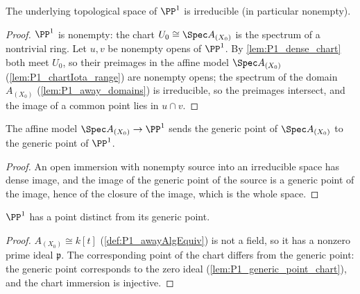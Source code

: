 \begin{theorem}
  \label{thm:P1_irreducible}
  \leanok
  The underlying topological space of \(\PP^1\) is irreducible (in particular nonempty).
\end{theorem}
\begin{proof}
  \leanok
  \(\PP^1\) is nonempty: the chart \(U_0 \cong \Spec A_{(X_0)}\) is the spectrum of a
  nontrivial ring. Let \(u, v\) be nonempty opens of \(\PP^1\). By
  \ref{lem:P1_dense_chart} both meet \(U_0\), so their preimages in the affine model
  \(\Spec A_{(X_0)}\) (\ref{lem:P1_chartIota_range}) are nonempty opens; the spectrum of
  the domain \(A_{(X_0)}\) (\ref{lem:P1_away_domains}) is irreducible, so the preimages
  intersect, and the image of a common point lies in \(u \cap v\).
\end{proof}

\begin{lemma}
  \label{lem:P1_generic_point_chart}
  \leanok
  The affine model \(\Spec A_{(X_0)} \to \PP^1\) sends the generic point of
  \(\Spec A_{(X_0)}\) to the generic point of \(\PP^1\).
\end{lemma}
\begin{proof}
  \leanok
  An open immersion with nonempty source into an irreducible space has dense image, and
  the image of the generic point of the source is a generic point of the image, hence of
  the closure of the image, which is the whole space.
\end{proof}

\begin{lemma}
  \label{lem:P1_exists_ne_generic}
  \leanok
  \(\PP^1\) has a point distinct from its generic point.
\end{lemma}
\begin{proof}
  \leanok
  \(A_{(X_0)} \cong k[t]\) (\ref{def:P1_awayAlgEquiv}) is not a field, so it has a nonzero
  prime ideal \(\mathfrak p\). The corresponding point of the chart differs from the
  generic point: the generic point corresponds to the zero ideal
  (\ref{lem:P1_generic_point_chart}), and the chart immersion is injective.
\end{proof}

